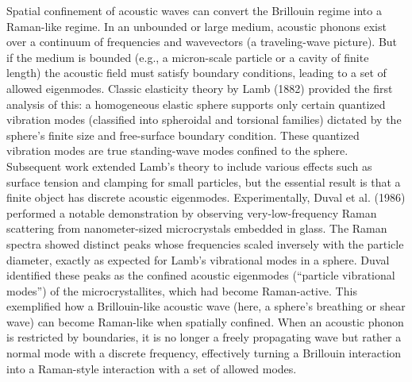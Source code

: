 Spatial confinement of acoustic waves can convert the Brillouin regime into a Raman-like regime. In an unbounded or large medium, acoustic phonons exist over a continuum of frequencies and wavevectors (a traveling-wave picture). But if the medium is bounded (e.g., a micron-scale particle or a cavity of finite length) the acoustic field must satisfy boundary conditions, leading to a set of allowed eigenmodes. Classic elasticity theory by Lamb (1882) \cite{lamb1881vibrations} provided the first analysis of this: a homogeneous elastic sphere supports only certain quantized vibration modes (classified into spheroidal and torsional families) dictated by the sphere’s finite size and free-surface boundary condition. These quantized vibration modes are true standing-wave modes confined to the sphere. Subsequent work extended Lamb’s theory to include various effects such as surface tension and clamping for small particles, \cite{} but the essential result is that a finite object has discrete acoustic eigenmodes. Experimentally, Duval et al. (1986) \cite{duval1986vibration} performed a notable demonstration by observing very-low-frequency Raman scattering from nanometer-sized microcrystals embedded in glass. The Raman spectra showed distinct peaks whose frequencies scaled inversely with the particle diameter, exactly as expected for Lamb’s vibrational modes in a sphere. Duval identified these peaks as the confined acoustic eigenmodes (``particle vibrational modes'') of the microcrystallites, which had become Raman-active. This exemplified how a Brillouin-like acoustic wave (here, a sphere’s breathing or shear wave) can become Raman-like when spatially confined. When an acoustic phonon is restricted by boundaries, it is no longer a freely propagating wave but rather a normal mode with a discrete frequency, effectively turning a Brillouin interaction into a Raman-style interaction with a set of allowed modes.

